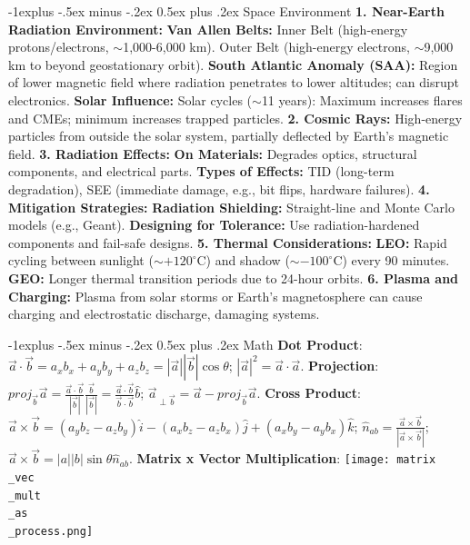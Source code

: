\documentclass[letterpaper, 8pt]{extarticle}
\makeatletter
\renewcommand{\section}{\@startsection{section}{1}{0mm}%
                                {-1explus -.5ex minus -.2ex}%
                                {0.5ex plus .2ex}%
                                {\normalfont\small\bfseries}}
\makeatother
\begin{document}
\begin{multicols*}{5}
\section{Space Environment}
\textbf{1. Near-Earth Radiation Environment:}
\textbf{Van Allen Belts:} Inner Belt (high-energy protons/electrons, $\sim$1,000-6,000 km). Outer Belt (high-energy electrons, $\sim$9,000 km to beyond geostationary orbit).
\textbf{South Atlantic Anomaly (SAA):} Region of lower magnetic field where radiation penetrates to lower altitudes; can disrupt electronics.
\textbf{Solar Influence:} Solar cycles ($\sim$11 years): Maximum increases flares and CMEs; minimum increases trapped particles.
\textbf{2. Cosmic Rays:}
High-energy particles from outside the solar system, partially deflected by Earth's magnetic field.
\pagebreak
\textbf{3. Radiation Effects:}
\textbf{On Materials:} Degrades optics, structural components, and electrical parts.
\textbf{Types of Effects:} TID (long-term degradation), SEE (immediate damage, e.g., bit flips, hardware failures).
\textbf{4. Mitigation Strategies:}
\textbf{Radiation Shielding:} Straight-line and Monte Carlo models (e.g., Geant).
\textbf{Designing for Tolerance:} Use radiation-hardened components and fail-safe designs.
\textbf{5. Thermal Considerations:}
\textbf{LEO:} Rapid cycling between sunlight ($\sim+120^\circ$C) and shadow ($\sim-100^\circ$C) every 90 minutes.
\textbf{GEO:} Longer thermal transition periods due to 24-hour orbits.
\textbf{6. Plasma and Charging:}
Plasma from solar storms or Earth's magnetosphere can cause charging and electrostatic discharge, damaging systems.

\section{Math}
\textbf{Dot Product}:
$\vec{a} \cdot \vec{b} = a_x b_x + a_y b_y + a_z b_z = |\vec{a}| |\vec{b}| \cos \theta$;
$|\vec{a}|^2 = \vec{a} \cdot \vec{a}$.
\textbf{Projection}:
$proj_{\vec{b}} \vec{a} = \frac{\vec{a} \cdot \vec{b}}{|\vec{b}|} \frac{\vec{b}}{|\vec{b}|} = \frac{\vec{a} \cdot \vec{b}}{\vec{b} \cdot \vec{b}}\hat{b}$;
$\vec{a}_{\perp \vec{b}} = \vec{a} - proj_{\vec{b}}\vec{a}$.
\textbf{Cross Product}:
$\vec{a} \times \vec{b} = (a_y b_z - a_z b_y)\hat{i} - (a_x b_z - a_z b_x)\hat{j} + (a_x b_y - a_y b_x)\hat{k}$;
$\hat{n}_{ab} = \frac{\vec{a} \times \vec{b}}{|\vec{a} \times \vec{b}|}$;
$\vec{a} \times \vec{b} = |a| |b| \sin \theta \hat{n}_{ab}$.
\textbf{Matrix x Vector Multiplication}:
\texttt{[image: matrix\\\_vec\\\_mult\\\_as\\\_process.png]}


\end{multicols*}
\end{document}
